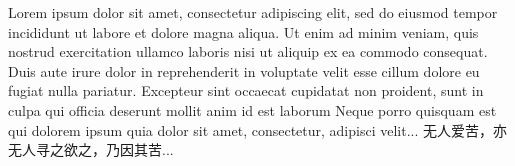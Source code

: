 \start\language[en]
\starttyping
Lorem ipsum dolor sit amet, consectetur adipiscing elit, 
sed do eiusmod tempor incididunt ut labore et dolore magna aliqua. 
Ut enim ad minim veniam, quis nostrud exercitation ullamco 
laboris nisi ut aliquip ex ea commodo consequat. 
Duis aute irure dolor in reprehenderit in voluptate velit 
esse cillum dolore eu fugiat nulla pariatur. 
Excepteur sint occaecat cupidatat non proident, sunt in 
culpa qui officia deserunt mollit anim id est laborum
Neque porro quisquam est qui dolorem ipsum quia dolor 
sit amet, consectetur, adipisci velit...
无人爱苦，亦无人寻之欲之，乃因其苦...
\stoptyping\stop